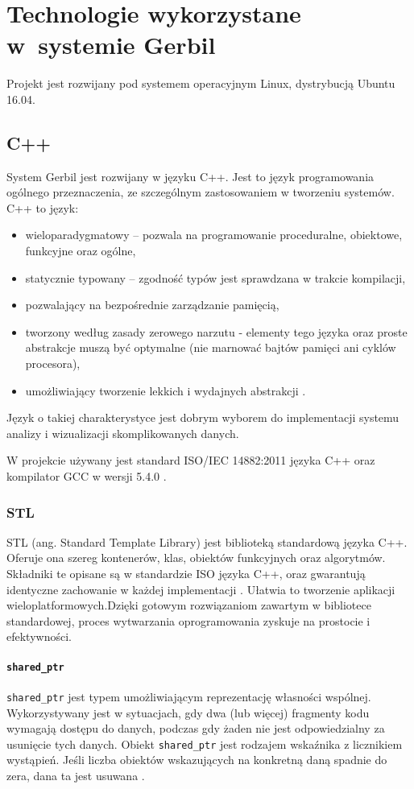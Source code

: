 \chapter{Technologie wykorzystane w~systemie Gerbil}

Projekt jest rozwijany pod systemem operacyjnym Linux, dystrybucją Ubuntu 16.04.

 \section{C++}
System Gerbil jest rozwijany w języku C++. Jest to język programowania ogólnego przeznaczenia, ze szczególnym zastosowaniem w tworzeniu systemów. C++ to język: 
\begin{itemize}
	\item wieloparadygmatowy -- pozwala na programowanie proceduralne, obiektowe, funkcyjne oraz ogólne,
	\item statycznie typowany -- zgodność typów jest sprawdzana w trakcie kompilacji,
	\item pozwalający na bezpośrednie zarządzanie pamięcią,
	\item tworzony według zasady zerowego narzutu - elementy tego języka oraz proste abstrakcje muszą być optymalne (nie marnować bajtów pamięci ani cyklów procesora),
	\item umożliwiający tworzenie lekkich i wydajnych abstrakcji \cite{Stroustrup}\cite{cplusplus}.
\end{itemize}

Język o takiej charakterystyce jest dobrym wyborem do implementacji systemu analizy i wizualizacji skomplikowanych danych.

W projekcie używany jest standard ISO/IEC 14882:2011 języka C++ oraz kompilator GCC w wersji 5.4.0 \cite{C++11}.

 \subsection{STL}
STL (ang. Standard Template Library) jest biblioteką standardową języka C++. Oferuje ona szereg kontenerów, klas, obiektów funkcyjnych oraz algorytmów. Składniki te opisane są w standardzie ISO języka C++, oraz gwarantują identyczne zachowanie w każdej implementacji \cite{Stroustrup}. Ułatwia to tworzenie aplikacji wieloplatformowych.Dzięki gotowym rozwiązaniom zawartym w bibliotece standardowej, proces wytwarzania oprogramowania zyskuje na prostocie i efektywności. 

 \subsubsection{\lstinline$shared_ptr$}
\lstinline$shared_ptr$ jest typem umożliwiającym reprezentację własności wspólnej. Wykorzystywany jest w sytuacjach, gdy dwa (lub więcej) fragmenty kodu wymagają dostępu do danych, podczas gdy żaden nie jest odpowiedzialny za usunięcie tych danych. Obiekt \lstinline$shared_ptr$ jest rodzajem wskaźnika z licznikiem wystąpień. Jeśli liczba obiektów wskazujących na konkretną daną spadnie do zera, dana ta jest usuwana \cite{Stroustrup}. 

